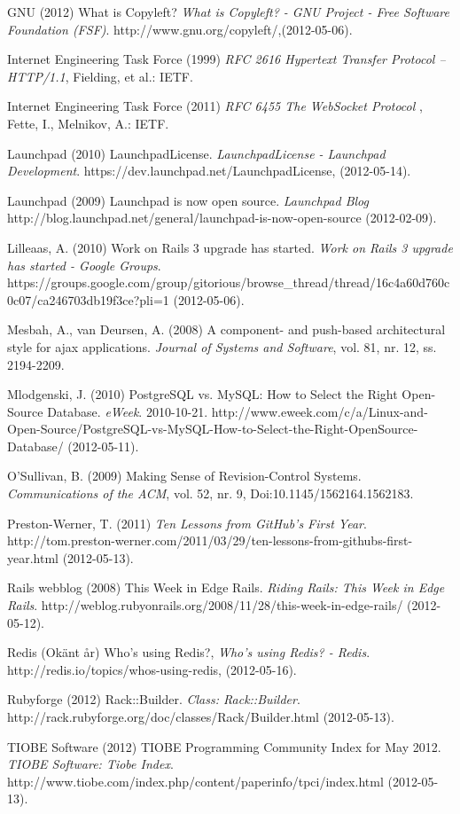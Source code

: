 \begin{flushleft}
GNU (2012) What is Copyleft? \emph{What is Copyleft? - GNU Project - Free Software Foundation (FSF)}. http://www.gnu.org/copyleft/,(2012-05-06).

Internet Engineering Task Force (1999) \emph{RFC 2616 Hypertext Transfer Protocol -- HTTP/1.1}, Fielding, et al.: IETF.

Internet Engineering Task Force (2011) \emph{RFC 6455 The WebSocket Protocol} , Fette, I., Melnikov, A.: IETF.

Launchpad (2010) LaunchpadLicense. \emph{LaunchpadLicense - Launchpad Development}. https://dev.launchpad.net/LaunchpadLicense, (2012-05-14).

Launchpad (2009) Launchpad is now open source. \emph{Launchpad Blog} http://blog.launchpad.net/general/launchpad-is-now-open-source (2012-02-09).

Lilleaas, A. (2010) Work on Rails 3 upgrade has started. \emph{Work on Rails 3 upgrade has started - Google Groups}. https://groups.google.com/group/gitorious/browse\_thread/thread/16c4a60d760c0c07/ca246703db19f3ce?pli=1 (2012-05-06).

Mesbah, A., van Deursen, A. (2008) A component- and push-based architectural style for ajax applications. \emph{Journal of Systems and Software}, vol. 81, nr. 12, ss. 2194-2209.

Mlodgenski, J. (2010) PostgreSQL vs. MySQL: How to Select the Right Open-Source Database. \emph{eWeek}. 2010-10-21.  http://www.eweek.com/c/a/Linux-and-Open-Source/PostgreSQL-vs-MySQL-How-to-Select-the-Right-OpenSource-Database/ (2012-05-11).

O'Sullivan, B. (2009) Making Sense of Revision-Control Systems. \emph{Communications of the ACM}, vol. 52, nr. 9, Doi:10.1145/1562164.1562183.

Preston-Werner, T. (2011) \emph{Ten Lessons from GitHub's First Year}. http://tom.preston-werner.com/2011/03/29/ten-lessons-from-githubs-first-year.html (2012-05-13).

Rails webblog (2008) This Week in Edge Rails. \emph{Riding Rails: This Week in Edge Rails}. http://weblog.rubyonrails.org/2008/11/28/this-week-in-edge-rails/ (2012-05-12).

Redis (Okänt år) Who's using Redis?, \emph{Who's using Redis? - Redis}. http://redis.io/topics/whos-using-redis, (2012-05-16).

Rubyforge (2012) Rack::Builder. \emph{Class: Rack::Builder}. http://rack.rubyforge.org/doc/classes/Rack/Builder.html (2012-05-13).

TIOBE Software (2012) TIOBE Programming Community Index for May 2012. \emph{TIOBE Software: Tiobe Index}. http://www.tiobe.com/index.php/content/paperinfo/tpci/index.html (2012-05-13).


\end{flushleft}
